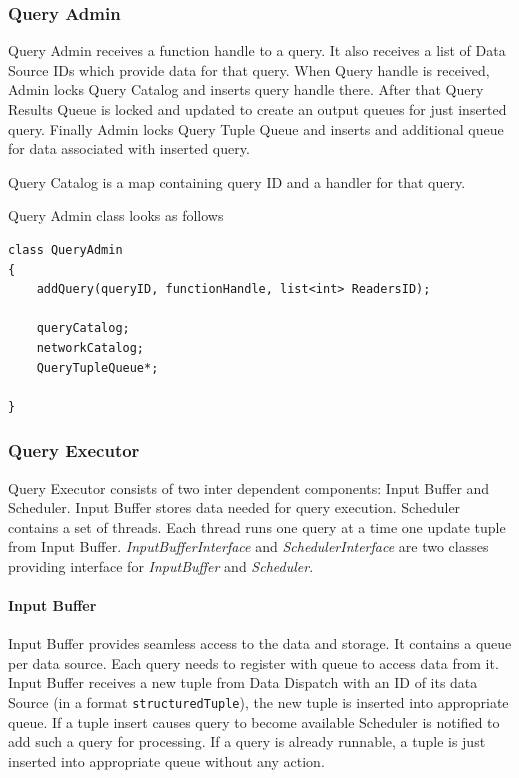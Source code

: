 \documentclass[14pt]{article}
\begin{document}
\subsubsection{Query Admin}

Query Admin receives a function handle to a query. It also receives a list of Data Source IDs which provide data for that query. When Query handle is received, Admin locks Query Catalog and inserts query handle there. After that Query Results Queue is locked and updated to create an output queues for just inserted query. Finally Admin locks Query Tuple Queue and inserts and additional queue for data associated with inserted query. 

Query Catalog is a map containing query ID and a handler for that query. 

Query Admin class looks as follows
\begin{verbatim}
class QueryAdmin
{
    addQuery(queryID, functionHandle, list<int> ReadersID);

	queryCatalog;
	networkCatalog;
	QueryTupleQueue*;
	
}
\end{verbatim}

\subsubsection{Query Executor}

Query Executor consists of two inter dependent components: Input Buffer and Scheduler. Input Buffer stores data needed for query execution. Scheduler contains a set of threads. Each thread runs one query at a time one update tuple from Input Buffer. \emph{InputBufferInterface} and \emph{SchedulerInterface} are two classes providing interface for \emph{InputBuffer} and \emph{Scheduler}. 

\paragraph{Input Buffer}

Input Buffer provides seamless access to the data and storage. It contains a queue per data source. Each query needs to register with queue to access data from it. Input Buffer receives a new tuple from Data Dispatch with an ID of its data Source (in a format {\tt structuredTuple}), the new tuple is inserted into appropriate queue. If a tuple insert causes query to become available Scheduler is notified to add such a query for processing. If a query is already runnable, a tuple is just inserted into appropriate queue without any action.
\end{document}
